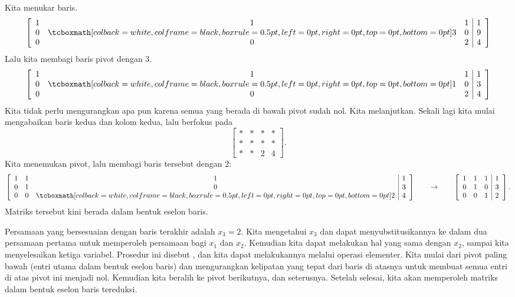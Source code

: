 Kita menukar baris.
\begin{equation*}
\left[
\begin{array}{ccc|c}
1 & 1 & 1 & 1 \\
0 & \mybxsm{3} & 0 & 9 \\
0 & 0 & 2 & 4
\end{array}
\right]
\end{equation*}
Lalu kita membagi baris pivot dengan 3.
\begin{equation*}
\left[
\begin{array}{ccc|c}
1 & 1 & 1 & 1 \\
0 & \mybxsm{1} & 0 & 3 \\
0 & 0 & 2 & 4
\end{array}
\right]
\end{equation*}
Kita tidak perlu mengurangkan apa pun karena semua yang berada di bawah pivot sudah
nol. Kita melanjutkan. Sekali lagi kita mulai mengabaikan baris kedua dan kolom
kedua, lalu berfokus pada
\begin{equation*}
\left[
\begin{array}{ccc|c}
* & * & * & * \\
* & * & * & * \\
* & * & 2 & 4
\end{array}
\right] .
\end{equation*}
Kita menemukan pivot, lalu membagi baris tersebut dengan 2:
\begin{equation*}
\left[
\begin{array}{ccc|c}
1 & 1 & 1 & 1 \\
0 & 1 & 0 & 3 \\
0 & 0 & \mybxsm{2} & 4
\end{array}
\right]
\qquad \to \qquad
\left[
\begin{array}{ccc|c}
1 & 1 & 1 & 1 \\
0 & 1 & 0 & 3 \\
0 & 0 & 1 & 2
\end{array}
\right] .
\end{equation*}
Matriks tersebut kini berada dalam bentuk eselon baris.

Persamaan yang bersesuaian dengan baris terakhir adalah $x_3 = 2$.
Kita mengetahui $x_3$ dan dapat
menyubstitusikannya ke dalam dua persamaan pertama untuk memperoleh persamaan bagi
$x_1$ dan $x_2$. Kemudian kita dapat melakukan hal yang sama dengan $x_2$, sampai kita menyelesaikan
ketiga variabel. Prosedur ini disebut
\emph{}, dan kita dapat melakukannya melalui operasi
elementer.
Kita mulai dari pivot paling bawah (entri utama dalam bentuk
eselon baris) dan mengurangkan kelipatan yang tepat dari baris di atasnya untuk
membuat semua entri di atas pivot ini menjadi nol.
Kemudian kita beralih ke pivot berikutnya, dan seterusnya.
Setelah selesai, kita akan memperoleh matriks dalam bentuk eselon baris tereduksi.


